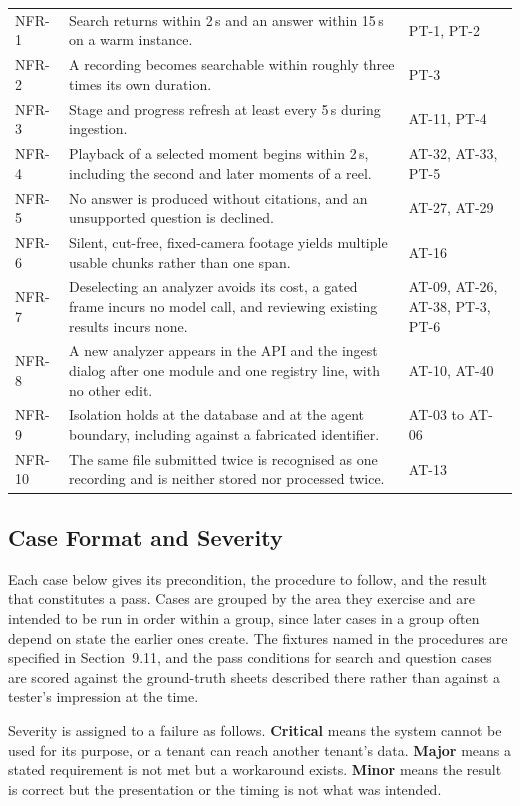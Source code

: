 \begin{table}[htbp]
\begin{tabularx}{\textwidth}{@{}L{1.2cm}XL{2.7cm}@{}}
\midrule
NFR-1  & Search returns within 2\,s and an answer within 15\,s on a warm instance. & PT-1, PT-2 \\
NFR-2  & A recording becomes searchable within roughly three times its own duration. & PT-3 \\
NFR-3  & Stage and progress refresh at least every 5\,s during ingestion. & AT-11, PT-4 \\
NFR-4  & Playback of a selected moment begins within 2\,s, including the second and later moments of a reel. & AT-32, AT-33, PT-5 \\
NFR-5  & No answer is produced without citations, and an unsupported question is declined. & AT-27, AT-29 \\
NFR-6  & Silent, cut-free, fixed-camera footage yields multiple usable chunks rather than one span. & AT-16 \\
NFR-7  & Deselecting an analyzer avoids its cost, a gated frame incurs no model call, and reviewing existing results incurs none. & AT-09, AT-26, AT-38, PT-3, PT-6 \\
NFR-8  & A new analyzer appears in the API and the ingest dialog after one module and one registry line, with no other edit. & AT-10, AT-40 \\
NFR-9  & Isolation holds at the database and at the agent boundary, including against a fabricated identifier. & AT-03 to AT-06 \\
NFR-10 & The same file submitted twice is recognised as one recording and is neither stored nor processed twice. & AT-13 \\
\bottomrule
\end{tabularx}
\end{table}

\subsection{Case Format and Severity}

Each case below gives its precondition, the procedure to follow, and the result that
constitutes a pass. Cases are grouped by the area they exercise and are intended to be
run in order within a group, since later cases in a group often depend on state the
earlier ones create. The fixtures named in the procedures are specified in
Section~9.11, and the pass conditions for search and question cases are scored against
the ground-truth sheets described there rather than against a tester's impression at
the time.

Severity is assigned to a failure as follows. \textbf{Critical} means the system cannot
be used for its purpose, or a tenant can reach another tenant's data. \textbf{Major}
means a stated requirement is not met but a workaround exists. \textbf{Minor} means the
result is correct but the presentation or the timing is not what was intended.

